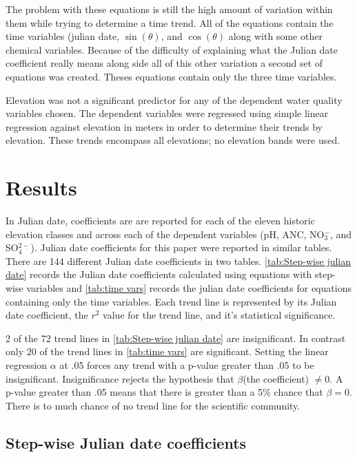 
 The problem with these equations is still the high amount of variation within them while trying to determine a time trend.  All of the equations contain the time variables (julian date, $\sin(\theta)$, and $\cos(\theta)$ along with some other chemical variables.  Because of the difficulty of explaining what the Julian date coefficient really means along side all of this other variation a second set of equations was created.  Theses equations contain only the three time variables.
 
 Elevation was not a significant predictor for any of the dependent water quality variables chosen.  The dependent variables were regressed using simple linear regression against elevation in meters in order to determine their trends by elevation.  These trends encompass all elevations; no elevation bands were used.
 
\section{Results}

In \citet{robinson2008ph} Julian date, coefficients are are reported for each of the eleven historic elevation classes and across each of the dependent variables (pH, ANC, NO$_3^-$, and SO$_4^{2-}$).  Julian date coefficients for this paper were reported in similar tables.  There are 144 different Julian date coefficients in two tables.  \autoref{tab:Step-wise julian date} records the Julian date coefficients calculated using equations with step-wise variables and \autoref{tab:time vars} records the julian date coefficients for  equations containing only the time variables.  Each trend line is represented by its Julian date coefficient, the $r^2$ value for the trend line, and it's statistical significance.

2 of the 72 trend lines in \autoref{tab:Step-wise julian date} are insignificant.  In contrast only 20 of the trend lines in \autoref{tab:time vars} are significant.   Setting the linear regression $\alpha$ at .05 forces any trend with a p-value greater than .05 to be insignificant.  Insignificance rejects the hypothesis that $\beta$(the coefficient) $\neq 0$.  A p-value greater than .05 means that there is greater than a 5$\%$ chance that $\beta=0$.  There is to much chance of no trend line for the scientific community.

\subsection{Step-wise Julian date coefficients}

